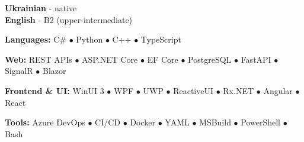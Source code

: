 \documentclass[9pt]{developercv} %
\begin{document}
\begin{minipage}[t]{0.27\textwidth} %
	\vspace{-\baselineskip} %
	
	\textbf{Ukrainian} - native\\
	\textbf{English} - B2 (upper-intermediate)\\
\end{minipage}
\hfill %
\begin{minipage}[t]{0.7\textwidth} %
	\vspace{-\baselineskip} %

\textbf{Languages:} C\# $\bullet$ Python $\bullet$ C++ $\bullet$ TypeScript

\textbf{Web:} REST APIs $\bullet$ ASP.NET Core $\bullet$ EF Core $\bullet$ PostgreSQL $\bullet$ FastAPI $\bullet$ SignalR $\bullet$ Blazor

\textbf{Frontend \& UI:} WinUI 3 $\bullet$ WPF $\bullet$ UWP $\bullet$ ReactiveUI $\bullet$ Rx.NET $\bullet$ Angular $\bullet$ React

\textbf{Tools:} Azure DevOps $\bullet$ CI/CD $\bullet$ Docker $\bullet$ YAML $\bullet$ MSBuild $\bullet$ PowerShell $\bullet$ Bash
\end{minipage}

\end{document}
